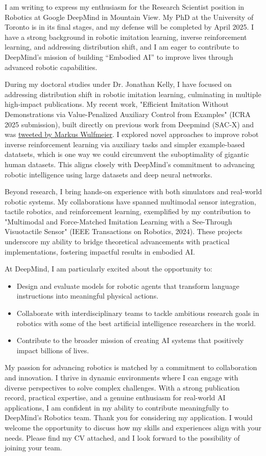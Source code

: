 I am writing to express my enthusiasm for the Research Scientist position in Robotics at Google DeepMind in Mountain View. 
My PhD at the University of Toronto is in its final stages, and my defense will be completed by April 2025. 
I have a strong background in robotic imitation learning, inverse reinforcement learning, and addressing distribution shift, and I am eager to contribute to DeepMind’s mission of building “Embodied AI” to improve lives through advanced robotic capabilities.

During my doctoral studies under Dr. Jonathan Kelly, I have focused on addressing distribution shift in robotic imitation learning, culminating in multiple high-impact publications. 
My recent work, "Efficient Imitation Without Demonstrations via Value-Penalized Auxiliary Control from Examples" (ICRA 2025 submission), built directly on previous work from Deepmind (SAC-X) and was \href{https://x.com/m_wulfmeier/status/1864709951823675882}{tweeted by Markus Wulfmeier}. 
I explored novel approaches to improve robot inverse reinforcement learning via auxiliary tasks and simpler example-based datatsets, which is one way we could circumvent the suboptimality of gigantic human datasets. 
This aligns closely with DeepMind’s commitment to advancing robotic intelligence using large datasets and deep neural networks.

Beyond research, I bring hands-on experience with both simulators and real-world robotic systems. 
My collaborations have spanned multimodal sensor integration, tactile robotics, and reinforcement learning, exemplified by my contribution to "Multimodal and Force-Matched Imitation Learning with a See-Through Visuotactile Sensor" (IEEE Transactions on Robotics, 2024). 
These projects underscore my ability to bridge theoretical advancements with practical implementations, fostering impactful results in embodied AI.

At DeepMind, I am particularly excited about the opportunity to:
\begin{itemize}
    \item Design and evaluate models for robotic agents that transform language instructions into meaningful physical actions.
    \item Collaborate with interdisciplinary teams to tackle ambitious research goals in robotics with some of the best artificial intelligence researchers in the world.
    \item Contribute to the broader mission of creating AI systems that positively impact billions of lives.
\end{itemize}

My passion for advancing robotics is matched by a commitment to collaboration and innovation. I thrive in dynamic environments where I can engage with diverse perspectives to solve complex challenges. With a strong publication record, practical expertise, and a genuine enthusiasm for real-world AI applications, I am confident in my ability to contribute meaningfully to DeepMind’s Robotics team.
Thank you for considering my application. I would welcome the opportunity to discuss how my skills and experiences align with your needs. Please find my CV attached, and I look forward to the possibility of joining your team.
